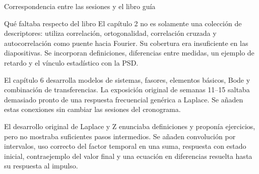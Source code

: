 \documentclass[
  10pt,
  ignorenonframetext,
  aspectratio=169,
  spanish,
]{beamer}
\begin{document}
\begin{frame}{Correspondencia entre las sesiones y el libro guía}
\begin{block}{Qué faltaba respecto del libro}
\label{quuxe9-faltaba-respecto-del-libro}
El capítulo 2 no es solamente una colección de descriptores: utiliza
correlación, ortogonalidad, correlación cruzada y autocorrelación como
puente hacia Fourier. Su cobertura era insuficiente en las diapositivas.
Se incorporan definiciones, diferencias entre medidas, un ejemplo de
retardo y el vínculo estadístico con la PSD.

El capítulo 6 desarrolla modelos de sistemas, fasores, elementos
básicos, Bode y combinación de transferencias. La exposición original de
semanas 11--15 saltaba demasiado pronto de una respuesta frecuencial
genérica a Laplace. Se añaden estas conexiones sin cambiar las sesiones
del cronograma.

El desarrollo original de Laplace y Z enunciaba definiciones y proponía
ejercicios, pero no mostraba suficientes pasos intermedios. Se añaden
convolución por intervalos, uso correcto del factor temporal en una
suma, respuesta con estado inicial, contraejemplo del valor final y una
ecuación en diferencias resuelta hasta su respuesta al impulso.
\end{block}
\end{frame}
\end{document}
